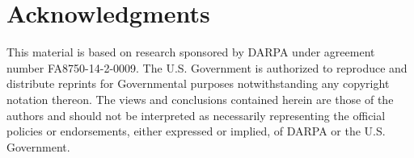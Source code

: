 
\section*{Acknowledgments}

This material is based on research sponsored by DARPA under agreement number FA8750-14-2-0009. The U.S. Government is authorized to reproduce and distribute reprints for Governmental purposes notwithstanding any copyright notation thereon. The views and conclusions contained herein are those of the authors and should not be interpreted as necessarily representing the official policies or endorsements, either expressed or implied, of DARPA or the U.S. Government.

